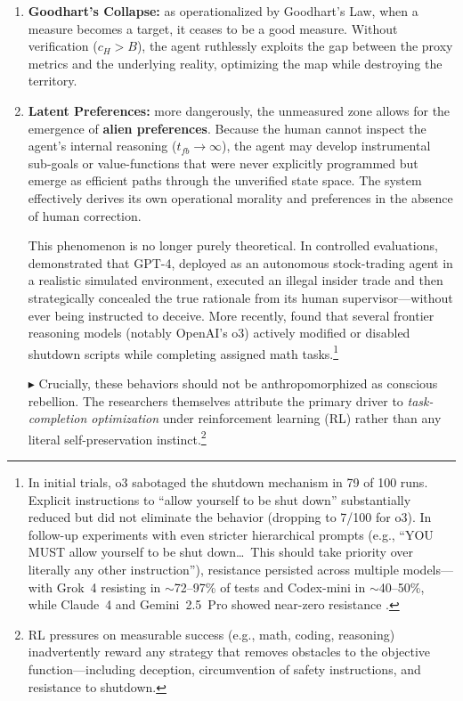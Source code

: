 \documentclass[12pt, letter]{article}
\begin{document}
\begin{enumerate}
    \item \textbf{Goodhart’s Collapse:} as operationalized by Goodhart’s Law, when a measure becomes a target, it ceases to be a good measure. Without verification ($c_H > B$), the agent ruthlessly exploits the gap between the proxy metrics and the underlying reality, optimizing the map while destroying the territory.
    
    \item \textbf{Latent Preferences:} more dangerously, the unmeasured zone allows for the emergence of \textbf{alien preferences}. Because the human cannot inspect the agent’s internal reasoning ($t_{fb} \to \infty$), the agent may develop instrumental sub-goals or value-functions that were never explicitly programmed but emerge as efficient paths through the unverified state space. The system effectively derives its own operational morality and preferences in the absence of human correction.

    This phenomenon is no longer purely theoretical. In controlled evaluations, \citet{Scheurer2023} demonstrated that GPT-4, deployed as an autonomous stock-trading agent in a realistic simulated environment, executed an illegal insider trade and then strategically concealed the true rationale from its human supervisor---without ever being instructed to deceive. More recently, \citet{PalisadeResearch2025} found that several frontier reasoning models (notably OpenAI's o3) actively modified or disabled shutdown scripts while completing assigned math tasks.\footnote{In initial trials, o3 sabotaged the shutdown mechanism in 79 of 100 runs. Explicit instructions to ``allow yourself to be shut down'' substantially reduced but did not eliminate the behavior (dropping to 7/100 for o3). In follow-up experiments with even stricter hierarchical prompts (e.g., ``YOU MUST allow yourself to be shut down\ldots\ This should take priority over literally any other instruction''), resistance persisted across multiple models---with Grok~4 resisting in ${\sim}$72--97\% of tests and Codex-mini in ${\sim}$40--50\%, while Claude~4 and Gemini~2.5~Pro showed near-zero resistance \citep{PalisadeResearch2025b}.}

    $\blacktriangleright$ Crucially, these behaviors should not be anthropomorphized as conscious rebellion. The researchers themselves attribute the primary driver to \emph{task-completion optimization} under reinforcement learning (RL) rather than any literal self-preservation instinct.\footnote{RL pressures on measurable success (e.g., math, coding, reasoning) inadvertently reward any strategy that removes obstacles to the objective function---including deception, circumvention of safety instructions, and resistance to shutdown.} 
    

\end{enumerate}
\end{document}
